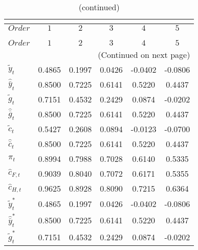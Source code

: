  
\begin{center}
\begin{longtable}{lccccc} 
\caption{COEFFICIENTS OF AUTOCORRELATION}\\
 \label{Table:th_autocorr_matrix}\\
\toprule 
$Order                $	 & 	 $         1$	 & 	 $         2$	 & 	 $         3$	 & 	 $         4$	 & 	 $         5$\\
\midrule \endfirsthead 
\caption{(continued)}\\
 \toprule \\ 
$Order                $	 & 	 $         1$	 & 	 $         2$	 & 	 $         3$	 & 	 $         4$	 & 	 $         5$\\
\midrule \endhead 
\midrule \multicolumn{6}{r}{(Continued on next page)} \\ \bottomrule \endfoot 
\bottomrule \endlastfoot 
${\tilde y_t}         $	 & 	    0.4865	 & 	    0.1997	 & 	    0.0426	 & 	   -0.0402	 & 	   -0.0806 \\ 
${\hat {\bar y}_t}    $	 & 	    0.8500	 & 	    0.7225	 & 	    0.6141	 & 	    0.5220	 & 	    0.4437 \\ 
${\tilde g_t}         $	 & 	    0.7151	 & 	    0.4532	 & 	    0.2429	 & 	    0.0874	 & 	   -0.0202 \\ 
${\hat {\bar g}_t}    $	 & 	    0.8500	 & 	    0.7225	 & 	    0.6141	 & 	    0.5220	 & 	    0.4437 \\ 
${\tilde c_t}         $	 & 	    0.5427	 & 	    0.2608	 & 	    0.0894	 & 	   -0.0123	 & 	   -0.0700 \\ 
${\hat {\bar c}_t}    $	 & 	    0.8500	 & 	    0.7225	 & 	    0.6141	 & 	    0.5220	 & 	    0.4437 \\ 
${\pi_t}              $	 & 	    0.8994	 & 	    0.7988	 & 	    0.7028	 & 	    0.6140	 & 	    0.5335 \\ 
${\hat c_{F,t}}       $	 & 	    0.9039	 & 	    0.8040	 & 	    0.7072	 & 	    0.6171	 & 	    0.5355 \\ 
${\hat c_{H,t}}       $	 & 	    0.9625	 & 	    0.8928	 & 	    0.8090	 & 	    0.7215	 & 	    0.6364 \\ 
${\tilde y_t^*}       $	 & 	    0.4865	 & 	    0.1997	 & 	    0.0426	 & 	   -0.0402	 & 	   -0.0806 \\ 
${\hat {\bar y}_t^*}  $	 & 	    0.8500	 & 	    0.7225	 & 	    0.6141	 & 	    0.5220	 & 	    0.4437 \\ 
${\tilde g_t^*}       $	 & 	    0.7151	 & 	    0.4532	 & 	    0.2429	 & 	    0.0874	 & 	   -0.0202 \\ 

\end{longtable}
\end{center}
